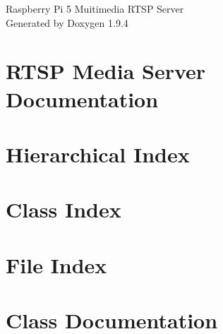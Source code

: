 \documentclass[twoside]{book}
\newcommand{\+}{\discretionary{\mbox{\scriptsize$\hookleftarrow$}}{}{}}
\newcommand{\clearemptydoublepage}{%
    \newpage{\pagestyle{empty}\cleardoublepage}%
  }
\begin{document}
  \raggedbottom
    \hypersetup{pageanchor=false,
                bookmarksnumbered=true,
                pdfencoding=unicode
               }
  \begin{titlepage}
  \vspace*{7cm}
  \begin{center}%
  {\Large Raspberry Pi 5 Muitimedia RTSP Server}\\
  \vspace*{1cm}
  {\large Generated by Doxygen 1.9.4}\\
  \end{center}
  \end{titlepage}
  \clearemptydoublepage
  \tableofcontents
  \clearemptydoublepage
  \hypersetup{pageanchor=true}
\chapter{RTSP Media Server Documentation}
\label{index}\hypertarget{index}{}
\chapter{Hierarchical Index}

\chapter{Class Index}

\chapter{File Index}

\chapter{Class Documentation}















\end{document}
